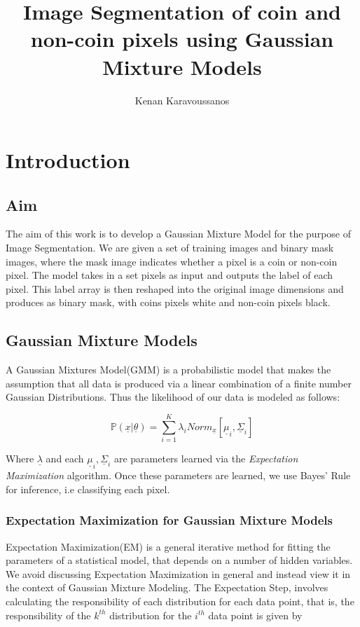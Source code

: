 \documentclass[11pt]{article}
\title{Image Segmentation of coin and non-coin pixels using Gaussian Mixture Models}
\author{Kenan Karavoussanos}
\begin{document}
	
	
	
	\maketitle
	
	\newpage
	
	
	\section{Introduction}
	

	\subsection{Aim} The aim of this work is to develop a Gaussian Mixture Model for the purpose of Image Segmentation. We are given a set of training images and binary mask images, where the mask image indicates whether a pixel is a coin or non-coin pixel. The model takes in a set pixels as input and outputs the label of each pixel. This label array is then reshaped into the original image dimensions and produces as binary mask, with coins pixels white and non-coin pixels black. 
	
	\subsection{Gaussian Mixture Models} A Gaussian Mixtures Model(GMM) is a probabilistic model that makes the assumption that all data is produced via a linear combination of a finite number Gaussian Distributions. Thus the likelihood of our data is modeled as follows:

	$$\mathbb{P}( \underline{x} \lvert \underline{\theta}) = \sum_{i=1}^{K} \lambda_i Norm_{\underline{x}}[\underline{\mu}_i, \underline{\Sigma}_i]$$

	Where $\underline{\lambda}$ and each $\underline{\mu}_i, \underline{\Sigma}_i$ are parameters learned via the \emph{Expectation Maximization} algorithm. Once these parameters are learned, we use Bayes' Rule for inference, i.e classifying each pixel. 
	
	
	\subsubsection{Expectation Maximization for Gaussian Mixture Models}
	
		
		Expectation Maximization(EM) is a general iterative method for fitting the parameters of a statistical model, that depends on a number of hidden variables. We avoid discussing Expectation Maximization in general and instead view it in the context of Gaussian Mixture Modeling. The Expectation Step, involves calculating the responsibility of each distribution for each data point, that is, the responsibility of the $k^{th}$ distribution for the $i^{th}$ data point is given by
		
\end{document}
